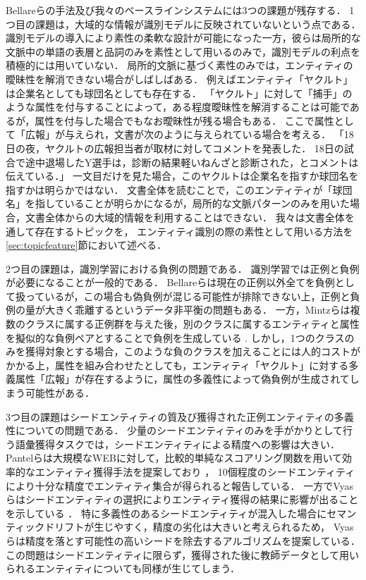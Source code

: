 \documentclass[japanese]{jnlp_1.4}
\begin{document}
Bellareらの手法及び我々のベースラインシステムには3つの課題が残存する．
1つ目の課題は，大域的な情報が識別モデルに反映されていないという点である．
識別モデルの導入により素性の柔軟な設計が可能になった一方，彼らは局所的な文脈中の単語の表層と品詞のみを素性として用いるのみで，識別モデルの利点を積極的には用いていない．
局所的文脈に基づく素性のみでは，エンティティの曖昧性を解消できない場合がしばしばある．
例えばエンティティ「ヤクルト」は企業名としても球団名としても存在する．
「ヤクルト」に対して「捕手」のような属性を付与することによって，ある程度曖昧性を解消することは可能であるが，属性を付与した場合でもなお曖昧性が残る場合もある．
ここで属性として「広報」が与えられ，文書が次のように与えられている場合を考える．
「18日の夜，ヤクルトの広報担当者が取材に対してコメントを発表した．
18日の試合で途中退場したY選手は，診断の結果軽いねんざと診断された，とコメントは伝えている．」
一文目だけを見た場合，このヤクルトは企業名を指すか球団名を指すかは明らかではない．
文書全体を読むことで，このエンティティが「球団名」を指していることが明らかになるが，局所的な文脈パターンのみを用いた場合，文書全体からの大域的情報を利用することはできない．
我々は文書全体を通して存在するトピックを，
エンティティ識別の際の素性として用いる方法を\ref{sec:topicfeature}節において述べる．


2つ目の課題は，識別学習における負例の問題である．
識別学習では正例と負例が必要になることが一般的である．
Bellareらは現在の正例以外全てを負例として扱っているが，この場合も偽負例が混じる可能性が排除できない上，正例と負例の量が大きく乖離するというデータ非平衡の問題もある．
一方，Mintzらは複数のクラスに属する正例群を与えた後，別のクラスに属するエンティティと属性を擬似的な負例ペアとすることで負例を生成している \cite{mintz2009distant}. 
しかし，1つのクラスのみを獲得対象とする場合，このような負のクラスを加えることには人的コストがかかる上，属性を組み合わせたとしても，エンティティ「ヤクルト」に対する多義属性「広報」が存在するように，属性の多義性によって偽負例が生成されてしまう可能性がある．


3つ目の課題はシードエンティティの質及び獲得された正例エンティティの多義性についての問題である．
少量のシードエンティティのみを手がかりとして行う語彙獲得タスクでは，シードエンティティによる精度への影響は大きい．
Pantelらは大規模なWEBに対して，比較的単純なスコアリング関数を用いて効率的なエンティティ獲得手法を提案しており \cite{pantel2009web}，
10個程度のシードエンティティにより十分な精度でエンティティ集合が得られると報告している．
一方でVyasらはシードエンティティの選択によりエンティティ獲得の結果に影響が出ることを示している \cite{vyas2009helping}．
特に多義性のあるシードエンティティが混入した場合にセマンティックドリフトが生じやすく，精度の劣化は大きいと考えられるため，
Vyasらは精度を落とす可能性の高いシードを除去するアルゴリズムを提案している．
この問題はシードエンティティに限らず，獲得された後に教師データとして用いられるエンティティについても同様が生じてしまう．
\end{document}
